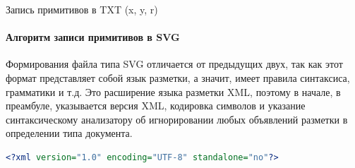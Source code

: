 \begin{algorithm}[H]
	\SetAlgoLined	
	
	
	 
	\caption{Запись примитивов в TXT (x, y, r)}
	\label{alg:primsintotxt}
\end{algorithm}

\paragraph{Алгоритм записи примитивов в SVG} 
\nopagebreak

Формирования файла типа SVG отличается от предыдущих двух, так как этот формат представляет собой язык разметки, а значит, имеет правила синтаксиса, грамматики и т.д. Это расширение языка разметки XML, поэтому в начале, в преамбуле, указывается версия XML, кодировка символов и указание синтаксическому анализатору об игнорировании любых объявлений разметки в определении типа документа.

\begin{lstlisting}[language=XML,caption={Первая строка SVG-файлов},label=list:1stsvgline]
	<?xml version="1.0" encoding="UTF-8" standalone="no"?>
\end{lstlisting}

